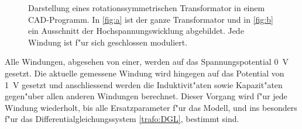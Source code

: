 \begin{refsection}
\begin{figure}
	\centering    
	\caption{Darstellung eines rotationssymmetrischen Transformator in einem CAD-Programm. In \ref{fig:a} ist der ganze Transformator und in \ref{fig:b} ein Ausschnitt der Hochspannungswicklung abgebildet. Jede Windung ist f"ur sich geschlossen moduliert.}
	\label{trafo:infolytica}
\end{figure}

Alle Windungen, abgesehen von einer, werden auf das Spannungspotential \SI{0}{\volt} gesetzt. Die aktuelle gemessene Windung wird hingegen auf das Potential von \SI{1}{\volt} gesetzt und anschliessend werden die Induktivit"aten sowie Kapazit"aten gegen"uber allen anderen Windungen berechnet. Dieser Vorgang wird f"ur jede Windung wiederholt, bis alle Ersatzparameter f"ur das Modell, und ins besonders f"ur das Differentialgleichungssystem \ref{trafo:DGL}, bestimmt sind.


\end{refsection}
